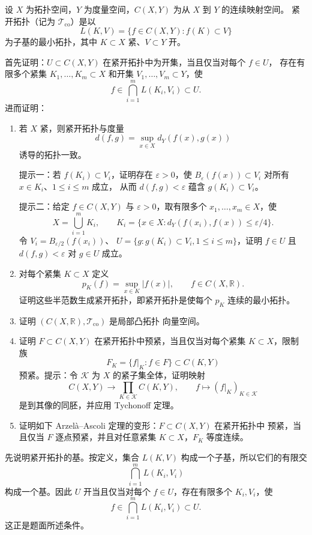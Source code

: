 \begin{problem}
设 $X$ 为拓扑空间，$Y$ 为度量空间，$C(X,Y)$ 为从 $X$ 到 $Y$ 的连续映射空间。
紧开拓扑（记为 $\mathcal T_{\mathrm{co}}$）是以
\[
 L(K,V)=\{f\in C(X,Y):f(K)\subset V\}
\]
为子基的最小拓扑，其中 $K\subset X$ 紧、$V\subset Y$ 开。

首先证明：$U\subset C(X,Y)$ 在紧开拓扑中为开集，当且仅当对每个 $f\in U$，
存在有限多个紧集 $K_1,\dots,K_m\subset X$ 和开集 $V_1,\dots,V_m\subset Y$，使
\[
 f\in\bigcap_{i=1}^mL(K_i,V_i)\subset U.
\]
进而证明：
\begin{enumerate}
 \item 若 $X$ 紧，则紧开拓扑与度量
 \[
  d(f,g)=\sup_{x\in X}d_Y(f(x),g(x))
 \]
 诱导的拓扑一致。

 提示一：若 $f(K_i)\subset V_i$，证明存在 $\varepsilon>0$，使
 $B_\varepsilon(f(x))\subset V_i$ 对所有 $x\in K_i$、$1\le i\le m$ 成立，
 从而 $d(f,g)<\varepsilon$ 蕴含 $g(K_i)\subset V_i$。

 提示二：给定 $f\in C(X,Y)$ 与 $\varepsilon>0$，取有限多个
 $x_1,\dots,x_m\in X$，使
 \[
  X=\bigcup_{i=1}^mK_i,\qquad
  K_i=\{x\in X:d_Y(f(x_i),f(x))\le\varepsilon/4\}.
 \]
 令 $V_i=B_{\varepsilon/2}(f(x_i))$、
 $U=\{g:g(K_i)\subset V_i, 1\le i\le m\}$，证明
 $f\in U$ 且 $d(f,g)<\varepsilon$ 对 $g\in U$ 成立。

 \item 对每个紧集 $K\subset X$ 定义
 \[
  p_K(f)=\sup_{x\in K}|f(x)|,\qquad f\in C(X,\mathbb R).
 \]
 证明这些半范数生成紧开拓扑，即紧开拓扑是使每个 $p_K$ 连续的最小拓扑。
 \item 证明 $(C(X,\mathbb R),\mathcal T_{\mathrm{co}})$ 是局部凸拓扑
 向量空间。
 \item 证明 $F\subset C(X,Y)$ 在紧开拓扑中预紧，当且仅当对每个紧集
 $K\subset X$，限制族
 \[
  F_K=\{f|_K:f\in F\}\subset C(K,Y)
 \]
 预紧。提示：令 $\mathcal K$ 为 $X$ 的紧子集全体，证明映射
 \[
  C(X,Y)\to\prod_{K\in\mathcal K}C(K,Y),\qquad
  f\mapsto(f|_K)_{K\in\mathcal K}
 \]
 是到其像的同胚，并应用 Tychonoff 定理。
 \item 证明如下 Arzel\`a--Ascoli 定理的变形：$F\subset C(X,Y)$ 在紧开拓扑中
 预紧，当且仅当 $F$ 逐点预紧，并且对任意紧集 $K\subset X$，$F_K$ 等度连续。
\end{enumerate}
\end{problem}

先说明紧开拓扑的基。按定义，集合 $L(K,V)$ 构成一个子基，所以它们的有限交
\[
 \bigcap_{i=1}^mL(K_i,V_i)
\]
构成一个基。因此 $U$ 开当且仅当对每个 $f\in U$，存在有限多个 $K_i,V_i$，使
\[
 f\in\bigcap_{i=1}^mL(K_i,V_i)\subset U.
\]
这正是题面所述条件。

